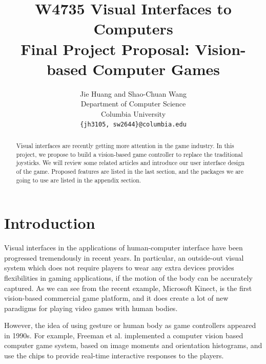 \documentclass[10pt,twocolumn,letterpaper]{article}
\begin{document}
\title{W4735 Visual Interfaces to Computers\\Final Project Proposal: Vision-based Computer Games}
\author{Jie Huang and Shao-Chuan Wang\\
Department of Computer Science\\
Columbia University\\
{\tt\small \{jh3105, sw2644\}@columbia.edu}
}

\maketitle
\thispagestyle{empty}

\begin{abstract}
Visual interfaces are recently getting more attention in the game 
industry. In this project, we propose to build a vision-based 
game controller to replace the traditional joysticks. 
We will review some related articles and introduce our user interface design
of the game. Proposed features are listed in the last section, and 
the packages we are going to use are listed in the appendix section.
\end{abstract}



\section{Introduction} %
Visual interfaces in the applications of human-computer interface 
have been progressed tremendously in recent years. In particular, an outside-out 
visual system \cite{outout} which does not require players to wear 
any extra devices provides flexibilities in gaming applications, if 
the motion of the body can be accurately captured.
As we can see from the recent example, Microsoft Kinect, is the 
first vision-based commercial game platform, and it does 
create a lot of new paradigms for playing video games with human bodies. 

However, the idea of using gesture or human body as game
controllers appeared in 1990s. For example, 
Freeman et al. \cite{cvicg, cvfcg} implemented a computer vision based 
computer game system, based on image moments and orientation histograms, and 
use the chips to provide real-time interactive responses to the players. 
\end{document}
